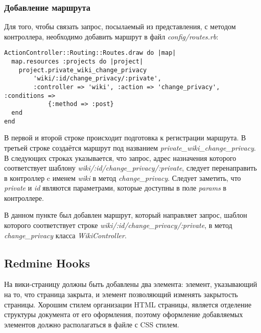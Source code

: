 \subsubsection{Добавление маршрута}
Для того, чтобы связать запрос, посылаемый из представления, с методом
контроллера, необходимо добавить маршрут в файл \textit{config/routes.rb}:
\small{\begin{lstlisting}
ActionController::Routing::Routes.draw do |map|
  map.resources :projects do |project|
    project.private_wiki_change_privacy
        'wiki/:id/change_privacy/:private',
        :controller => 'wiki', :action => 'change_privacy',  :conditions =>
            {:method => :post}
  end
end
\end{lstlisting}}
В первой и второй строке происходит подготовка к регистрации маршрута. В
третьей строке создаётся маршрут под названием
\textit{private\_wiki\_change\_privacy}.
В следующих строках указывается, что запрос, адрес назначения которого
соответствует шаблону \textit{wiki/:id/change\_privacy/:\-private}, следует
перенаправить в контроллер c именем \textit{wiki} в метод
\textit{change\_privacy}. Следует заметить, что \textit{private} и \textit{id}
являются параметрами, которые доступны в поле \textit{params} в контроллере.

В данном пункте был добавлен маршрут, который направляет запрос, шаблон
которого соответствует строке \textit{wiki/:id/change\_privacy/:\-private}, в
метод \textit{change\_privacy} класса \textit{WikiController}.


\subsection{Redmine Hooks}
\label{section:redmine_hooks}
На вики-страницу должны быть добавлены два элемента: элемент, указывающий на
то, что страница закрыта, и элемент позволяющий изменять закрытость страницы.
Хорошим стилем организации HTML страницы, является отделение структуры
документа от его оформления, поэтому оформление добавляемых элементов должно
располагаться в файле с CSS стилем.

